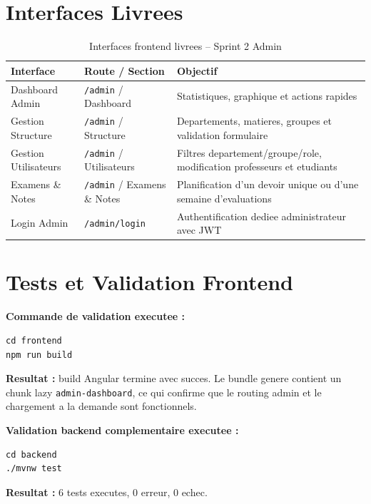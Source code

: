 \documentclass[12pt,a4paper]{report}
\begin{document}
\section{Interfaces Livrees}

\begin{table}[H]
\centering
\caption{Interfaces frontend livrees -- Sprint 2 Admin}
\begin{tabular}{|p{4cm}|p{4cm}|p{5cm}|}
\hline
\textbf{Interface} & \textbf{Route / Section} & \textbf{Objectif} \\
\hline
Dashboard Admin & \texttt{/admin} / Dashboard & Statistiques, graphique et actions rapides \\
\hline
Gestion Structure & \texttt{/admin} / Structure & Departements, matieres, groupes et validation formulaire \\
\hline
Gestion Utilisateurs & \texttt{/admin} / Utilisateurs & Filtres departement/groupe/role, modification professeurs et etudiants \\
\hline
Examens \& Notes & \texttt{/admin} / Examens \& Notes & Planification d'un devoir unique ou d'une semaine d'evaluations \\
\hline
Login Admin & \texttt{/admin/login} & Authentification dediee administrateur avec JWT \\
\hline
\end{tabular}
\end{table}

\section{Tests et Validation Frontend}

\textbf{Commande de validation executee :}

\begin{verbatim}
cd frontend
npm run build
\end{verbatim}

\textbf{Resultat :} build Angular termine avec succes. Le bundle genere contient un chunk lazy \texttt{admin-dashboard}, ce qui confirme que le routing admin et le chargement a la demande sont fonctionnels.

\textbf{Validation backend complementaire executee :}

\begin{verbatim}
cd backend
./mvnw test
\end{verbatim}

\textbf{Resultat :} 6 tests executes, 0 erreur, 0 echec.
\end{document}
